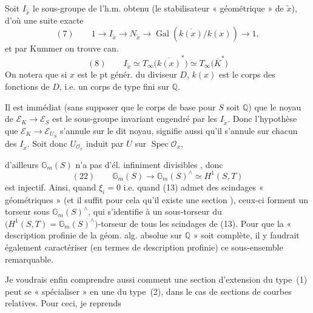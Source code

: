 \documentclass[11pt,a4paper]{article}
\begin{document}
Soit $I_{\tilde{x}}$ le sous-groupe  de l'h.m. obtenu (le
stabilisateur « géométrique » de $\tilde{x}$), d'où une suite exacte
\[
  (7)\qquad 1 \to I_{\tilde{x}} \to N_{\tilde{x}} \to \operatorname{Gal}(\overline{k(x)}/k(x)) \to 1 ,
\]
et par Kummer on trouve can.
\[
  (8)\qquad I_{\tilde{x}} \simeq T_{\infty}\bigl(\overline{k(x)}^{*}\bigr) \simeq T_{\infty}\bigl(\overline{K}^{*}\bigr)
\]
On notera que si $x$ est le pt génér. du diviseur $D$, $k(x)$ est le corps des
fonctions de $D$, i.e. un corps de type fini sur $\mathbb{Q}$.

Il est immédiat (sans supposer que le corps de base pour $S$ soit $\mathbb{Q}$)
que le noyau de $\mathcal{E}_K \to \mathcal{E}_S$ est le sous-groupe invariant
engendré par les $I_{\tilde{x}}$. Donc l'hypothèse que
$\mathcal{E}_K \to \mathcal{E}_{U_S}$ s'annule sur le dit noyau, signifie aussi
qu'il s'annule sur chacun des $I_{\tilde{x}}$. Soit donc $U_{\mathcal{O}_x}$
induit par $U$ sur $\operatorname{Spec} \mathcal{O}_x$, \ill{}


d'ailleurs $\mathbb{G}_m(S)$ n'a pas d'él. infiniment divisibles
\struck{\ill{}}, donc
\[
  (22)\qquad \mathbb{G}_m(S) \longrightarrow \mathbb{G}_m(S)^{\wedge} \simeq H^1(S, T)
\]
est injectif. Ainsi, quand $\xi_i = 0$ i.e. quand (13) admet des scindages
« géométriques » (et il suffit pour cela qu'il existe une section
), ceux-ci forment un torseur sous \struck{\ill{}}
$\mathbb{G}_m(S)^{\wedge}$, qui s'identifie à un sous-torseur du
$\bigl(H^1(S, T) = \mathbb{G}_m(S)^{\wedge}\bigr)$-torseur de tous les
scindages de (13). Pour que la « description profinie de la géom. alg. absolue
sur $\mathbb{Q}$ » soit complète, il y faudrait également caractériser (en
termes de  description profinie) ce sous-ensemble remarquable.

Je voudrais enfin comprendre aussi comment une section d'extension du type~(1)
peut se « spécialiser » en une du type~(2), dans le cas de sections de courbes
relatives. Pour ceci, je reprends
\end{document}
